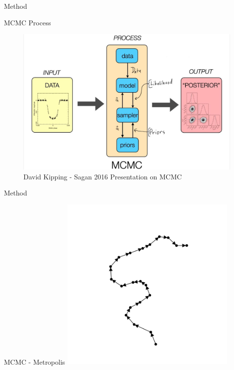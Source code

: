 \documentclass[t,10pt,fleqn]{beamer}
\begin{document}
\begin{frame}{Method}
	\vspace{-.3cm}
	\begin{block}{MCMC Process}
		\centering
		\begin{figure}
			\includegraphics[width=0.9\linewidth]{mcmc-diag-kipping}
			\caption{David Kipping - Sagan 2016 Presentation on MCMC}
		\end{figure}
	\end{block}
\end{frame}

\begin{frame}{Method}
	\vspace{-.3cm}
	\centering
	\begin{block}{MCMC - Metropolis}
		\includegraphics[width=0.65\textwidth]{mcmc-start.png}
	\end{block}
\end{frame}
\end{document}
